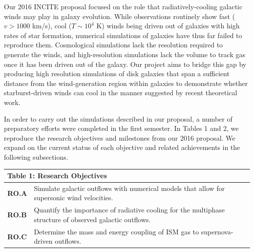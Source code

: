 \documentclass[11pt,letterpaper,english]{article}
\begin{document}
Our 2016 INCITE proposal focused on the role that radiatively-cooling galactic winds may play in galaxy evolution. While observations routinely show fast ($v > 1000$ km/s), cool ($T\sim10^4$ K) winds being driven out of galaxies with high rates of star formation, numerical simulations of galaxies have thus far failed to reproduce them. Cosmological simulations lack the resolution required to generate the winds, and high-resolution simulations lack the volume to track gas once it has been driven out of the galaxy. Our project aims to bridge this gap by producing high resolution simulations of disk galaxies that span a sufficient distance from the wind-generation region within galaxies to demonstrate whether starburst-driven winds can cool in the manner suggested by recent theoretical work.

In order to carry out the simulations described in our proposal, a number of preparatory efforts were completed in the first semester. In Tables 1 and 2, we reproduce the research objectives and milestones from our 2016 proposal. We expand on the current status of each objective and related achievements in the following subsections.

\begin{table}[h]
\vspace{-.12in}
\begin{tabular}{|l|l|} 
\multicolumn{2}{l}{\bf{Table 1: Research Objectives}}\\
\hline
\textbf{RO.A} & Simulate galactic outflows with numerical models that allow for supersonic
wind velocities. \\ \hline
\textbf{RO.B} & Quantify the importance of radiative cooling 
for the multiphase structure of observed galactic outflows.\\ \hline
\textbf{RO.C} & Determine the mass and energy coupling of ISM gas to supernova-driven outflows.\\
\hline
\end{tabular}
\end{table}
\end{document}
